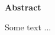 \newpage
    \begin{center}
    
        \vspace*{0.05cm}
        \Large
        \textbf{Abstract}\\
        \vspace{0.5cm}
        
    \end{center}

Some text ...